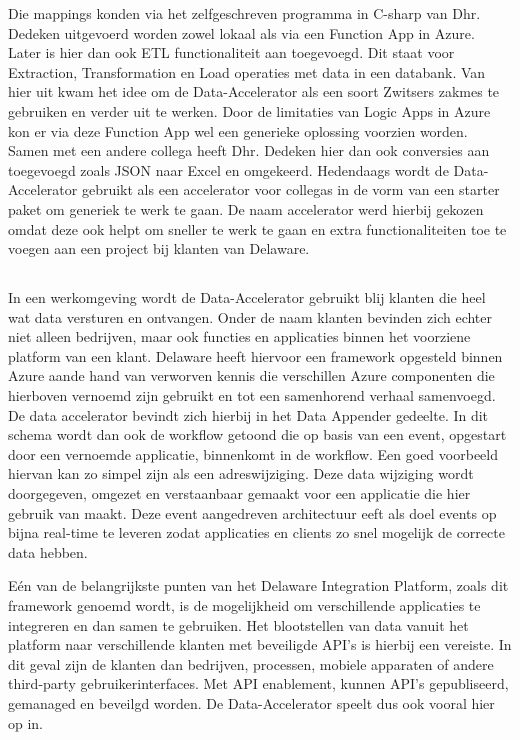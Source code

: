 Die mappings konden via het zelfgeschreven programma in C-sharp van Dhr. Dedeken uitgevoerd worden zowel lokaal als via een Function App in Azure. Later is hier dan ook ETL functionaliteit aan toegevoegd. Dit staat voor Extraction, Transformation en Load operaties met data in een databank. Van hier uit kwam het idee om de Data-Accelerator als een soort Zwitsers zakmes te gebruiken en verder uit te werken. Door de limitaties van Logic Apps in Azure kon er via deze Function App wel een generieke oplossing voorzien worden. Samen met een andere collega heeft Dhr. Dedeken hier dan ook conversies aan toegevoegd zoals JSON naar Excel en omgekeerd. Hedendaags wordt de Data-Accelerator gebruikt als een accelerator voor collegas in de vorm van een starter paket om generiek te werk te gaan. De naam accelerator werd hierbij gekozen omdat deze ook helpt om sneller te werk te gaan en extra functionaliteiten toe te voegen aan een project bij klanten van Delaware.\autocite{LopezNovoa2015}

\subsection{}%
\label{sec:Werkomgeving}

In een werkomgeving wordt de Data-Accelerator gebruikt blij klanten die heel wat data versturen en ontvangen. Onder de naam klanten bevinden zich echter niet alleen bedrijven, maar ook functies en applicaties binnen het voorziene platform van een klant. Delaware heeft hiervoor een framework opgesteld binnen Azure aande hand van verworven kennis die verschillen Azure componenten die hierboven vernoemd zijn gebruikt en tot een samenhorend verhaal samenvoegd. De data accelerator bevindt zich hierbij in het Data Appender gedeelte. In dit schema wordt dan ook de workflow getoond die op basis van een event, opgestart door een vernoemde applicatie, binnenkomt in de workflow. Een goed voorbeeld hiervan kan zo simpel zijn als een adreswijziging. Deze data wijziging wordt doorgegeven, omgezet en verstaanbaar gemaakt voor een applicatie die hier gebruik van maakt. Deze event aangedreven architectuur eeft als doel events op bijna real-time te leveren zodat applicaties en clients zo snel mogelijk de correcte data hebben.

Eén van de belangrijkste punten van het Delaware Integration Platform, zoals dit framework genoemd wordt, is de mogelijkheid om verschillende applicaties te integreren en dan samen te gebruiken. Het blootstellen van data vanuit het platform naar verschillende klanten met beveiligde API's is hierbij een vereiste. In dit geval zijn de klanten dan bedrijven, processen, mobiele apparaten of andere third-party gebruikerinterfaces. Met API enablement, kunnen API's gepubliseerd, gemanaged en beveilgd worden. De Data-Accelerator speelt dus ook vooral hier op in.

